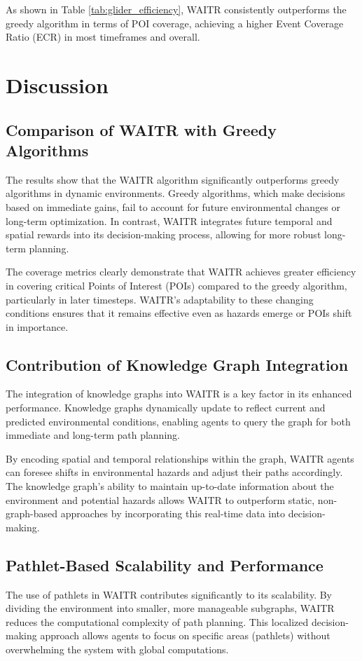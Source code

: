 \documentclass[conference]{IEEEtran}
\begin{document}
As shown in Table \ref{tab:glider_efficiency}, WAITR consistently outperforms the greedy algorithm in terms of POI coverage, achieving a higher Event Coverage Ratio (ECR) in most timeframes and overall.

\section{Discussion}

\subsection{Comparison of WAITR with Greedy Algorithms}
The results show that the WAITR algorithm significantly outperforms greedy algorithms in dynamic environments. Greedy algorithms, which make decisions based on immediate gains, fail to account for future environmental changes or long-term optimization. In contrast, WAITR integrates future temporal and spatial rewards into its decision-making process, allowing for more robust long-term planning.

The coverage metrics clearly demonstrate that WAITR achieves greater efficiency in covering critical Points of Interest (POIs) compared to the greedy algorithm, particularly in later timesteps. WAITR's adaptability to these changing conditions ensures that it remains effective even as hazards emerge or POIs shift in importance.

\subsection{Contribution of Knowledge Graph Integration}
The integration of knowledge graphs into WAITR is a key factor in its enhanced performance. Knowledge graphs dynamically update to reflect current and predicted environmental conditions, enabling agents to query the graph for both immediate and long-term path planning.

By encoding spatial and temporal relationships within the graph, WAITR agents can foresee shifts in environmental hazards  and adjust their paths accordingly. The knowledge graph's ability to maintain up-to-date information about the environment and potential hazards allows WAITR to outperform static, non-graph-based approaches by incorporating this real-time data into decision-making.

\subsection{Pathlet-Based Scalability and Performance}
The use of pathlets in WAITR contributes significantly to its scalability. By dividing the environment into smaller, more manageable subgraphs, WAITR reduces the computational complexity of path planning. This localized decision-making approach allows agents to focus on specific areas (pathlets) without overwhelming the system with global computations.
\end{document}
